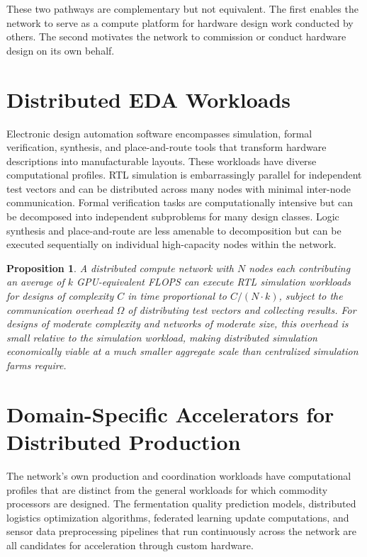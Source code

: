 \documentclass[12pt]{book}
\newtheorem{proposition}[theorem]{Proposition}
\theoremstyle{definition}
\theoremstyle{remark}
\begin{document}
These two pathways are complementary but not equivalent. The first
enables the network to serve as a compute platform for hardware
design work conducted by others. The second motivates the network
to commission or conduct hardware design on its own behalf.

\section{Distributed EDA Workloads}

Electronic design automation software encompasses simulation, formal
verification, synthesis, and place-and-route tools that transform
hardware descriptions into manufacturable layouts. These workloads
have diverse computational profiles. RTL simulation is
embarrassingly parallel for independent test vectors and can be
distributed across many nodes with minimal inter-node communication.
Formal verification tasks are computationally intensive but can be
decomposed into independent subproblems for many design classes.
Logic synthesis and place-and-route are less amenable to
decomposition but can be executed sequentially on individual
high-capacity nodes within the network.

\begin{proposition}
A distributed compute network with $N$ nodes each contributing
an average of $k$ GPU-equivalent FLOPS can execute RTL simulation
workloads for designs of complexity $C$ in time proportional to
$C / (N \cdot k)$, subject to the communication overhead
$\Omega$ of distributing test vectors and collecting results.
For designs of moderate complexity and networks of moderate
size, this overhead is small relative to the simulation workload,
making distributed simulation economically viable at a much
smaller aggregate scale than centralized simulation farms require.
\end{proposition}

\section{Domain-Specific Accelerators for Distributed Production}

The network's own production and coordination workloads have
computational profiles that are distinct from the general workloads
for which commodity processors are designed. The fermentation
quality prediction models, distributed logistics optimization
algorithms, federated learning update computations, and sensor
data preprocessing pipelines that run continuously across the
network are all candidates for acceleration through custom hardware.
\end{document}
